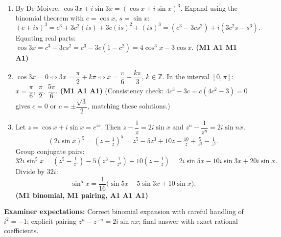 \documentclass[11pt]{article}
\begin{document}
\begin{corrige}
\begin{enumerate}
\item By De Moivre, $\cos 3x + i\sin 3x = (\cos x + i\sin x)^3$. Expand using the binomial theorem with $c = \cos x$, $s = \sin x$:
\[ (c + is)^3 = c^3 + 3c^2(is) + 3c(is)^2 + (is)^3 = (c^3 - 3cs^2) + i(3c^2s - s^3). \]
Equating real parts: $\cos 3x = c^3 - 3cs^2 = c^3 - 3c(1-c^2) = 4\cos^3 x - 3\cos x$. \hfill \textbf{(M1 A1 M1 A1)}
\item $\cos 3x = 0 \iff 3x = \dfrac{\pi}{2} + k\pi \iff x = \dfrac{\pi}{6} + \dfrac{k\pi}{3}$, $k \in \mathbb{Z}$.
In the interval $[0,\pi]$: $x = \dfrac{\pi}{6},\ \dfrac{\pi}{2},\ \dfrac{5\pi}{6}$. \hfill \textbf{(M1 A1 A1)}
(Consistency check: $4c^3 - 3c = c(4c^2 - 3) = 0$ gives $c = 0$ or $c = \pm\dfrac{\sqrt{3}}{2}$, matching these solutions.)
\item Let $z = \cos x + i\sin x = e^{ix}$. Then $z - \dfrac{1}{z} = 2i\sin x$ and $z^n - \dfrac{1}{z^n} = 2i\sin nx$.
\[ (2i\sin x)^5 = \left(z - \tfrac{1}{z}\right)^5 = z^5 - 5z^3 + 10z - \tfrac{10}{z} + \tfrac{5}{z^3} - \tfrac{1}{z^5}. \]
Group conjugate pairs:
\[ 32i\sin^5 x = \left(z^5 - \tfrac{1}{z^5}\right) - 5\left(z^3 - \tfrac{1}{z^3}\right) + 10\left(z - \tfrac{1}{z}\right) = 2i\sin 5x - 10i\sin 3x + 20i\sin x. \]
Divide by $32i$:
\[ \sin^5 x = \frac{1}{16}\bigl(\sin 5x - 5\sin 3x + 10\sin x\bigr). \]
\hfill \textbf{(M1 binomial, M1 pairing, A1 A1 A1)}
\end{enumerate}
\textbf{Examiner expectations:} Correct binomial expansion with careful handling of $i^2 = -1$; explicit pairing $z^n - z^{-n} = 2i\sin nx$; final answer with exact rational coefficients.
\end{corrige}
\end{document}
